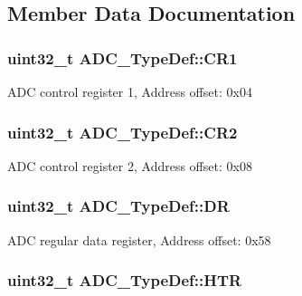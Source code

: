 \subsection{Member Data Documentation}
\hypertarget{struct_a_d_c___type_def_a89b1ff4376683dd2896ea8b32ded05b2}{
\subsubsection[{C\-R1}]{ uint32\-\_\-t A\-D\-C\-\_\-\-Type\-Def\-::\-C\-R1}}\label{struct_a_d_c___type_def_a89b1ff4376683dd2896ea8b32ded05b2}
A\-D\-C control register 1, Address offset\-: 0x04 \hypertarget{struct_a_d_c___type_def_a1053a65a21af0d27afe1bf9cf7b7aca7}{
\subsubsection[{C\-R2}]{ uint32\-\_\-t A\-D\-C\-\_\-\-Type\-Def\-::\-C\-R2}}\label{struct_a_d_c___type_def_a1053a65a21af0d27afe1bf9cf7b7aca7}
A\-D\-C control register 2, Address offset\-: 0x08 \hypertarget{struct_a_d_c___type_def_a84114accead82bd11a0e12a429cdfed9}{
\subsubsection[{D\-R}]{ uint32\-\_\-t A\-D\-C\-\_\-\-Type\-Def\-::\-D\-R}}\label{struct_a_d_c___type_def_a84114accead82bd11a0e12a429cdfed9}
A\-D\-C regular data register, Address offset\-: 0x58 \hypertarget{struct_a_d_c___type_def_a297ac2d83a1837bfdc0333474b977de0}{
\subsubsection[{H\-T\-R}]{ uint32\-\_\-t A\-D\-C\-\_\-\-Type\-Def\-::\-H\-T\-R}}\label{struct_a_d_c___type_def_a297ac2d83a1837bfdc0333474b977de0}
